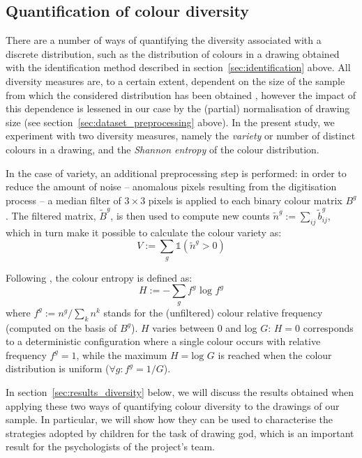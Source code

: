 \documentclass[11pt,a4paper]{article}
\begin{document}
\subsection{Quantification of colour diversity}
\label{sec:diversity}

There are a number of ways of quantifying the diversity associated with a discrete distribution, such as the distribution of colours in a drawing obtained with the identification method described in section~\ref{sec:identification} above. All diversity measures are, to a certain extent, dependent on the size of the sample from which the considered distribution has been obtained \cite[see e.g.][]{TweedieBaayen1998}, however the impact of this dependence is lessened in our case by the (partial) normalisation of drawing size (see section~\ref{sec:dataset_preprocessing} above). In the present study, we experiment with two diversity measures, namely the {\em variety} or number of distinct colours in a drawing, and the {\em Shannon entropy} of the colour distribution.

In the case of variety, an additional preprocessing step is performed: in order to reduce the amount of noise -- anomalous pixels resulting from the digitisation process -- a median filter of \(3 \times 3\) pixels is applied to each binary colour matrix $B^{g}$. The filtered matrix, $\tilde{B}^{g}$, is then used to compute new counts $\tilde{n}^{g} := \sum_{ij}\tilde{b}_{ij}^{g}$, which in turn make it possible to calculate the colour variety as:
\begin{equation}
	V := \sum_{g}\mathds{1}(\tilde{n}^{g} > 0)
\end{equation}

Following \citet{Shannon1948}, the colour entropy is defined as:
\begin{equation}
	H := -\sum_{g} f^{g}\mbox{ log }f^{g}
\end{equation}
where $f^{g}:= n^{g}/\sum_{k}n^{k}$ stands for the (unfiltered) colour relative frequency (computed on the basis of $B^{g}$). $H$ varies between 0 and log $G$: $H=0$ corresponds to a deterministic configuration where a single colour occurs with relative frequency $f^{g} = 1$, while the maximum $H=\mbox{log }G$ is reached when the colour distribution is uniform ($\forall g: f^{g} = 1/G$).

In section~\ref{sec:results_diversity} below, we will discuss the results obtained when applying these two ways of quantifying colour diversity to the drawings of our sample. In particular, we will show how they can be used to characterise the strategies adopted by children for the task of drawing god, which is an important result for the psychologists of the project's team.
\end{document}
